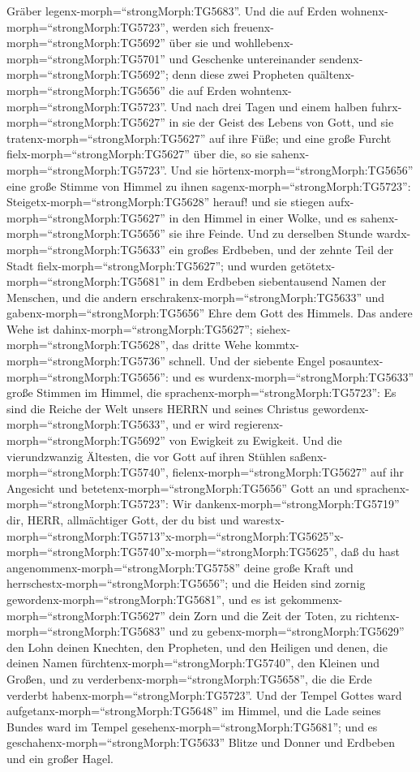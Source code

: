 Gräber legenx-morph=``strongMorph:TG5683''.  Und die auf
Erden wohnenx-morph=``strongMorph:TG5723'', werden sich
freuenx-morph=``strongMorph:TG5692'' über sie und
wohllebenx-morph=``strongMorph:TG5701'' und Geschenke untereinander
sendenx-morph=``strongMorph:TG5692''; denn diese zwei Propheten
quältenx-morph=``strongMorph:TG5656'' die auf Erden
wohntenx-morph=``strongMorph:TG5723''.  Und nach drei Tagen
und einem halben fuhrx-morph=``strongMorph:TG5627'' in sie der Geist des
Lebens von Gott, und sie tratenx-morph=``strongMorph:TG5627'' auf ihre
Füße; und eine große Furcht fielx-morph=``strongMorph:TG5627'' über die,
so sie sahenx-morph=``strongMorph:TG5723''.  Und sie
hörtenx-morph=``strongMorph:TG5656'' eine große Stimme von Himmel zu
ihnen sagenx-morph=``strongMorph:TG5723'':
Steigetx-morph=``strongMorph:TG5628'' herauf! und sie stiegen
aufx-morph=``strongMorph:TG5627'' in den Himmel in einer Wolke, und es
sahenx-morph=``strongMorph:TG5656'' sie ihre Feinde.  Und
zu derselben Stunde wardx-morph=``strongMorph:TG5633'' ein großes
Erdbeben, und der zehnte Teil der Stadt
fielx-morph=``strongMorph:TG5627''; und wurden
getötetx-morph=``strongMorph:TG5681'' in dem Erdbeben siebentausend
Namen der Menschen, und die andern
erschrakenx-morph=``strongMorph:TG5633'' und
gabenx-morph=``strongMorph:TG5656'' Ehre dem Gott des Himmels.
 Das andere Wehe ist dahinx-morph=``strongMorph:TG5627'';
siehex-morph=``strongMorph:TG5628'', das dritte Wehe
kommtx-morph=``strongMorph:TG5736'' schnell.  Und der
siebente Engel posauntex-morph=``strongMorph:TG5656'': und es
wurdenx-morph=``strongMorph:TG5633'' große Stimmen im Himmel, die
sprachenx-morph=``strongMorph:TG5723'': Es sind die Reiche der Welt
unsers HERRN und seines Christus gewordenx-morph=``strongMorph:TG5633'',
und er wird regierenx-morph=``strongMorph:TG5692'' von Ewigkeit zu
Ewigkeit.  Und die vierundzwanzig Ältesten, die vor Gott
auf ihren Stühlen saßenx-morph=``strongMorph:TG5740'',
fielenx-morph=``strongMorph:TG5627'' auf ihr Angesicht und
betetenx-morph=``strongMorph:TG5656'' Gott an  und
sprachenx-morph=``strongMorph:TG5723'': Wir
dankenx-morph=``strongMorph:TG5719'' dir, HERR, allmächtiger Gott, der
du bist und
warestx-morph=``strongMorph:TG5713''\textbar x-morph=``strongMorph:TG5625''x-morph=``strongMorph:TG5740''\textbar x-morph=``strongMorph:TG5625'',
daß du hast angenommenx-morph=``strongMorph:TG5758'' deine große Kraft
und herrschestx-morph=``strongMorph:TG5656'';  und die
Heiden sind zornig gewordenx-morph=``strongMorph:TG5681'', und es ist
gekommenx-morph=``strongMorph:TG5627'' dein Zorn und die Zeit der Toten,
zu richtenx-morph=``strongMorph:TG5683'' und zu
gebenx-morph=``strongMorph:TG5629'' den Lohn deinen Knechten, den
Propheten, und den Heiligen und denen, die deinen Namen
fürchtenx-morph=``strongMorph:TG5740'', den Kleinen und Großen, und zu
verderbenx-morph=``strongMorph:TG5658'', die die Erde verderbt
habenx-morph=``strongMorph:TG5723''.  Und der Tempel Gottes
ward aufgetanx-morph=``strongMorph:TG5648'' im Himmel, und die Lade
seines Bundes ward im Tempel gesehenx-morph=``strongMorph:TG5681''; und
es geschahenx-morph=``strongMorph:TG5633'' Blitze und Donner und
Erdbeben und ein großer Hagel.

